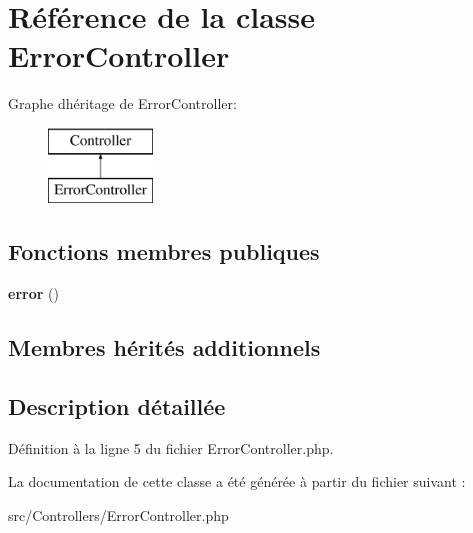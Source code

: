 \hypertarget{class_controllers_1_1_error_controller}{}\section{Référence de la classe Error\+Controller}
\label{class_controllers_1_1_error_controller}
Graphe d\textquotesingle{}héritage de Error\+Controller\+:\begin{figure}[H]
\begin{center}
\leavevmode
\includegraphics[height=2.000000cm]{class_controllers_1_1_error_controller}
\end{center}
\end{figure}
\subsection*{Fonctions membres publiques}
\begin{DoxyCompactItemize}
\item 
{\bfseries error} ()\hypertarget{class_controllers_1_1_error_controller_a43b8d30b879d4f09ceb059b02af2bc02}{}\label{class_controllers_1_1_error_controller_a43b8d30b879d4f09ceb059b02af2bc02}

\end{DoxyCompactItemize}
\subsection*{Membres hérités additionnels}


\subsection{Description détaillée}


Définition à la ligne 5 du fichier Error\+Controller.\+php.



La documentation de cette classe a été générée à partir du fichier suivant \+:\begin{DoxyCompactItemize}
\item 
src/\+Controllers/Error\+Controller.\+php\end{DoxyCompactItemize}
